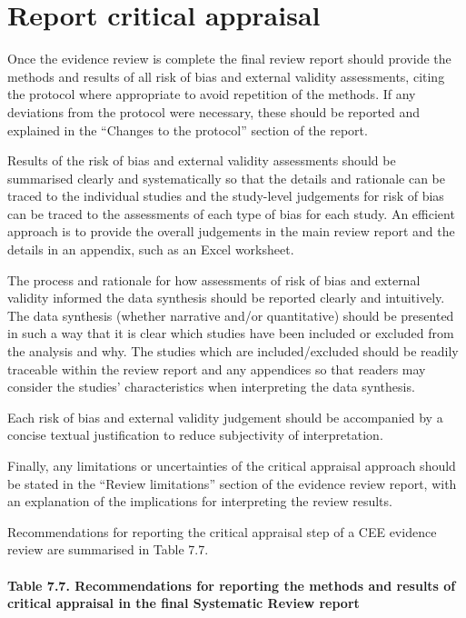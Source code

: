 \documentclass[
  letterpaper,
  DIV=11,
  numbers=noendperiod]{scrreprt}
\makeatletter
\let\oldparagraph\paragraph
\renewcommand{\paragraph}{
    \@ifstar
      \xxxParagraphStar
      \xxxParagraphNoStar
  }
\newcommand{\xxxParagraphStar}[1]{\oldparagraph*{#1}\mbox{}}
\newcommand{\xxxParagraphNoStar}[1]{\oldparagraph{#1}\mbox{}}
\makeatother
\begin{document}
\section{Report critical appraisal}\label{report-critical-appraisal}

Once the evidence review is complete the final review report should
provide the methods and results of all risk of bias and external
validity assessments, citing the protocol where appropriate to avoid
repetition of the methods. If any deviations from the protocol were
necessary, these should be reported and explained in the ``Changes to
the protocol'' section of the report.

Results of the risk of bias and external validity assessments should be
summarised clearly and systematically so that the details and rationale
can be traced to the individual studies and the study-level judgements
for risk of bias can be traced to the assessments of each type of bias
for each study. An efficient approach is to provide the overall
judgements in the main review report and the details in an appendix,
such as an Excel worksheet.

The process and rationale for how assessments of risk of bias and
external validity informed the data synthesis should be reported clearly
and intuitively. The data synthesis (whether narrative and/or
quantitative) should be presented in such a way that it is clear which
studies have been included or excluded from the analysis and why. The
studies which are included/excluded should be readily traceable within
the review report and any appendices so that readers may consider the
studies' characteristics when interpreting the data synthesis.

Each risk of bias and external validity judgement should be accompanied
by a concise textual justification to reduce subjectivity of
interpretation.

Finally, any limitations or uncertainties of the critical appraisal
approach should be stated in the ``Review limitations'' section of the
evidence review report, with an explanation of the implications for
interpreting the review results.

Recommendations for reporting the critical appraisal step of a CEE
evidence review are summarised in Table 7.7.

\paragraph{\texorpdfstring{\textbf{Table 7.7. Recommendations for
reporting the methods and results of critical appraisal in the final
Systematic Review
report}}{Table 7.7. Recommendations for reporting the methods and results of critical appraisal in the final Systematic Review report}}\label{table-7.7.-recommendations-for-reporting-the-methods-and-results-of-critical-appraisal-in-the-final-systematic-review-report}
\end{document}
